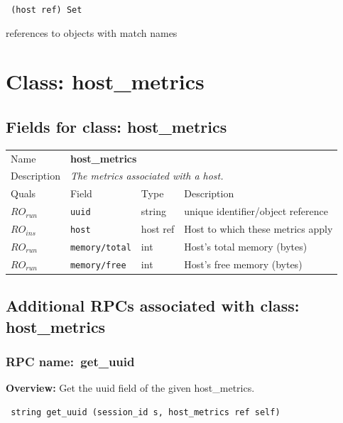 \vspace{0.3cm}

{\tt 
(host ref) Set
}


references to objects with match names
\vspace{0.3cm}
\vspace{0.3cm}
\vspace{0.3cm}

\vspace{1cm}
\newpage
\section{Class: host\_metrics}
\subsection{Fields for class: host\_metrics}
\begin{longtable}{|lllp{}|}
\hline
\multicolumn{1}{|l}{Name} & \multicolumn{3}{l|}{\bf host\_metrics} \\
\multicolumn{1}{|l}{Description} & \multicolumn{3}{l|}{\parbox{11cm}{\em
The metrics associated with a host.}} \\
\hline
Quals & Field & Type & Description \\
\hline
$\mathit{RO}_\mathit{run}$ &  {\tt uuid} & string & unique identifier/object reference \\
$\mathit{RO}_\mathit{ins}$ &  {\tt host} & host ref & Host to which these metrics apply \\
$\mathit{RO}_\mathit{run}$ &  {\tt memory/total} & int & Host's total memory (bytes) \\
$\mathit{RO}_\mathit{run}$ &  {\tt memory/free} & int & Host's free memory (bytes) \\
\hline
\end{longtable}
\subsection{Additional RPCs associated with class: host\_metrics}
\subsubsection{RPC name:~get\_uuid}

{\bf Overview:} 
Get the uuid field of the given host\_metrics.

\begin{verbatim} string get_uuid (session_id s, host_metrics ref self)\end{verbatim}


